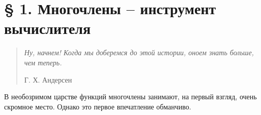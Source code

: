 \documentclass[twocolumn]{article}
\begin{document}


\section*{§ 1. Многочлены -- инструмент вычислителя}
\begin{quote}
\small\textit{Ну, начнем! Когда мы доберемся до 
этой истории, оноем знать
больше, чем теперь.}

\hfill{Г. Х. Андерсен}
\end{quote}

\noindent В необозримом царстве функций многочлены занимают, на первый взгляд, очень скромное место. Однако это первое впечатление обманчиво.
\end{document}
